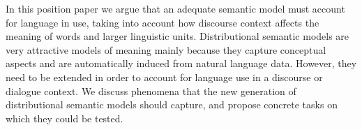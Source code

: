 In this position paper we argue that an adequate semantic model must account for language in use, taking into account how discourse context affects the meaning of words and larger linguistic units. Distributional semantic models are very attractive models of meaning mainly because they capture conceptual aspects and are automatically induced from natural language data. However, they need to be extended in order to account for language use in a discourse or dialogue context. We discuss phenomena that the new generation of distributional semantic models should capture, and propose concrete tasks on which they could be tested.

